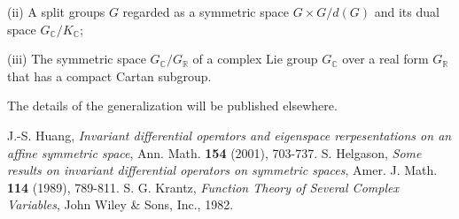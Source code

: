 \documentclass[a4paper]{amsart}
\theoremstyle{plain}
\theoremstyle{definition}
\newcommand{\bbC}{\mathbb{C}}
\newcommand{\bbR}{\mathbb{R}}
\begin{document}
(ii) A split groups $G$ regarded as a symmetric space $G\times G/d(G)$ and its dual space $G_\bbC/K_\bbC$;

(iii) The symmetric space $G_\bbC/ G_\bbR$ of a complex Lie group $G_\bbC$
over a real form  $G_\bbR$ that has a compact Cartan subgroup.

The details of the generalization will be published elsewhere.


\begin{thebibliography}{9}
 J.-S. Huang,
\emph{Invariant differential operators and eigenspace rerpesentations on
an affine symmetric space}, Ann. Math.  \textbf{154} (2001), 703-737.
 S. Helgason,
\emph{Some results on invariant differential operators  on
symmetric spaces}, Amer. J. Math.  \textbf{114} (1989), 789-811.
 S. G. Krantz,
\emph{Function Theory of Several Complex Variables},
John Wiley \& Sons, Inc., 1982.
\end{thebibliography}
\end{document}
